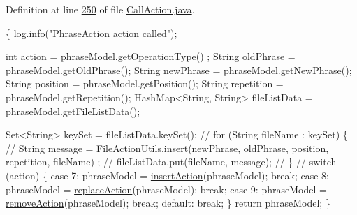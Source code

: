 Definition at line \hyperlink{L250}{250} of file \hyperlink{}{Call\-Action.\-java}.


\begin{DoxyCode}
                                                                               
           \{
        \hyperlink{classcom_1_1poly_1_1nlp_1_1filekommander_1_1file_1_1actions_1_1_call_action_a65b722d9482bd93c3ae2b31f51050a08}{log}.info(\textcolor{stringliteral}{"PhraseAction action called"});

        \textcolor{keywordtype}{int} action = phraseModel.getOperationType() ;
        String oldPhrase = phraseModel.getOldPhrase();
        String newPhrase = phraseModel.getNewPhrase();
        String position = phraseModel.getPosition();
        String repetition = phraseModel.getRepetition();
        HashMap<String, String> fileListData = phraseModel.getFileListData();
        
        Set<String> keySet = fileListData.keySet();
\textcolor{comment}{//      for (String fileName : keySet) \{}
\textcolor{comment}{//      String message = FileActionUtils.insert(newPhrase, oldPhrase, position,
       repetition, fileName) ; }
\textcolor{comment}{//      fileListData.put(fileName, message);}
\textcolor{comment}{//      \}}
\textcolor{comment}{//      }
        \textcolor{keywordflow}{switch} (action) \{
        \textcolor{keywordflow}{case} 7:
            phraseModel = \hyperlink{classcom_1_1poly_1_1nlp_1_1filekommander_1_1file_1_1actions_1_1_call_action_adfcc0c66568ec9741ea5e31e3e01a6a7}{insertAction}(phraseModel);
            \textcolor{keywordflow}{break};
        \textcolor{keywordflow}{case} 8:
            phraseModel = \hyperlink{classcom_1_1poly_1_1nlp_1_1filekommander_1_1file_1_1actions_1_1_call_action_a1abbb90122eecab26024b7b09b59dd2b}{replaceAction}(phraseModel);
            \textcolor{keywordflow}{break};
        \textcolor{keywordflow}{case} 9:
            phraseModel = \hyperlink{classcom_1_1poly_1_1nlp_1_1filekommander_1_1file_1_1actions_1_1_call_action_ab396ed906e943060dd09fae42b6d473c}{removeAction}(phraseModel);
            \textcolor{keywordflow}{break};
        \textcolor{keywordflow}{default}:
            \textcolor{keywordflow}{break};
        \}
        \textcolor{keywordflow}{return} phraseModel;     
    \}
\end{DoxyCode}
